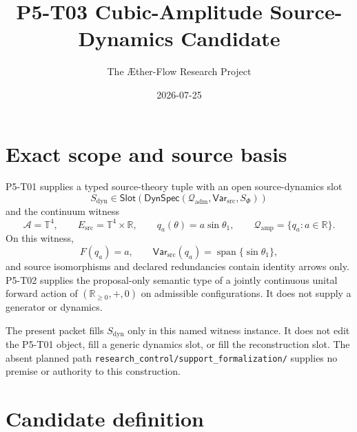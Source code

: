 \documentclass[11pt]{article}
\title{P5-T03 Cubic-Amplitude Source-Dynamics Candidate}
\author{The \AE ther-Flow Research Project}
\date{2026-07-25}
\newcommand{\Qamp}{\mathcal Q_{\mathrm{amp}}}
\newcommand{\Var}{\mathsf{Var}_{\mathrm{src}}}
\begin{document}
\maketitle

\begin{center}
\end{center}

\section{Exact scope and source basis}

P5-T01 supplies a typed source-theory tuple with an open source-dynamics slot
\[
 S_{\mathrm{dyn}}\in
 \mathsf{Slot}\!\left(
   \mathsf{DynSpec}(\mathcal Q_{\mathrm{adm}},
                    \mathsf{Var}_{\mathrm{src}},S_\Phi)
 \right)
\]
and the continuum witness
\[
 \mathcal A=\mathbb T^4,\qquad
 E_{\mathrm{src}}=\mathbb T^4\times\mathbb R,\qquad
 q_a(\theta)=a\sin\theta_1,\qquad
 \Qamp=\{q_a:a\in\mathbb R\}.
\]
On this witness,
\[
 F(q_a)=a,\qquad
 \Var(q_a)=\operatorname{span}\{\sin\theta_1\},
\]
and source isomorphisms and declared redundancies contain identity arrows
only.  P5-T02 supplies the proposal-only semantic type of a jointly continuous
unital forward action of
\((\mathbb R_{\geq0},+,0)\) on admissible configurations.  It does not supply a
generator or dynamics.

The present packet fills \(S_{\mathrm{dyn}}\) only in this named witness
instance.  It does not edit the P5-T01 object, fill a generic dynamics slot, or
fill the reconstruction slot.  The absent planned path
\texttt{research\_control/support\_formalization/} supplies no premise or
authority to this construction.

\section{Candidate definition}
\end{document}
